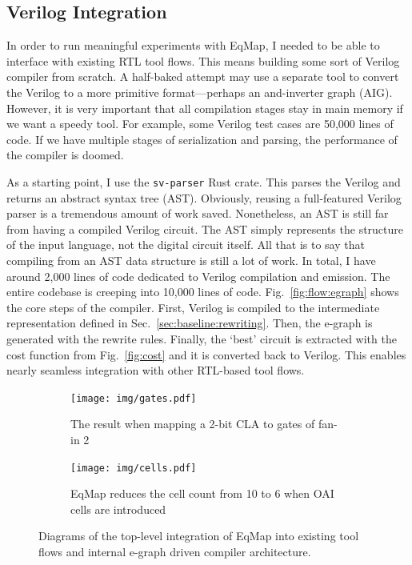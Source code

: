 \documentclass[10pt,letterpaper]{article}
\newcommand{\shortname}{EqMap}
\begin{document}
\subsection{Verilog Integration}\label{sec:baseline:backend}

In order to run meaningful experiments with \shortname{}, I needed to be able
to interface with existing RTL tool flows. This means building some sort of
Verilog compiler from scratch. A half-baked attempt may use a separate tool to
convert the Verilog to a more primitive format---perhaps an and-inverter graph
(AIG). However, it is very important that all compilation stages stay in main
memory if we want a speedy tool. For example, some Verilog test cases are
50,000 lines of code. If we have multiple stages of serialization and parsing,
the performance of the compiler is doomed.

As a starting point, I use the \texttt{sv-parser} Rust crate. This parses the
Verilog and returns an abstract syntax tree (AST). Obviously, reusing a
full-featured Verilog parser is a tremendous amount of work saved. Nonetheless,
an AST is still far from having a compiled Verilog circuit. The AST simply
represents the structure of the input language, not the digital circuit itself.
All that is to say that compiling from an AST data structure is still a lot of
work. In total, I have around 2,000 lines of code dedicated to Verilog
compilation and emission. The entire codebase is creeping into 10,000 lines of
code. Fig.~\ref{fig:flow:egraph} shows the core steps of the compiler. First,
Verilog is compiled to the intermediate representation defined in
Sec.~\ref{sec:baseline:rewriting}. Then, the e-graph is generated with the
rewrite rules. Finally, the `best' circuit is extracted with the cost function
from Fig.~\ref{fig:cost} and it is converted back to Verilog. This enables
nearly seamless integration with other RTL-based tool flows.

\begin{figure}[h]
    \begin{subfigure}{\textwidth}
        \centering
        \texttt{[image: img/gates.pdf]}
        \caption{The result when mapping a 2-bit CLA to gates of fan-in 2}\label{fig:test:gates}
    \end{subfigure}\vspace{0.5cm}
    \begin{subfigure}{\textwidth}
        \centering
        \texttt{[image: img/cells.pdf]}
        \caption{EqMap reduces the cell count from 10 to 6 when OAI cells are introduced}\label{fig:test:cells}
    \end{subfigure}
    \caption{Diagrams of the top-level integration of \shortname{} into existing tool flows and internal e-graph driven compiler architecture.}\label{fig:flow}
\end{figure}
\end{document}
